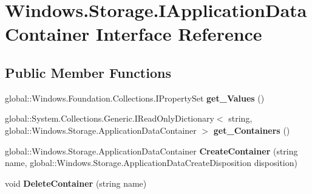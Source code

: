\hypertarget{interface_windows_1_1_storage_1_1_i_application_data_container}{}\section{Windows.\+Storage.\+I\+Application\+Data\+Container Interface Reference}
\label{interface_windows_1_1_storage_1_1_i_application_data_container}
\subsection*{Public Member Functions}
\begin{DoxyCompactItemize}
\item 
\mbox{\label{interface_windows_1_1_storage_1_1_i_application_data_container_a6a8a475818330878971aadb509a49dde}} 
global\+::\+Windows.\+Foundation.\+Collections.\+I\+Property\+Set {\bfseries get\+\_\+\+Values} ()
\item 
\mbox{\label{interface_windows_1_1_storage_1_1_i_application_data_container_a08ebbc78fa92d7dcaea9b36261b01f7c}} 
global\+::\+System.\+Collections.\+Generic.\+I\+Read\+Only\+Dictionary$<$ string, global\+::\+Windows.\+Storage.\+Application\+Data\+Container $>$ {\bfseries get\+\_\+\+Containers} ()
\item 
\mbox{\label{interface_windows_1_1_storage_1_1_i_application_data_container_ad3ca0020aa9ff4735e605413e9948f61}} 
global\+::\+Windows.\+Storage.\+Application\+Data\+Container {\bfseries Create\+Container} (string name, global\+::\+Windows.\+Storage.\+Application\+Data\+Create\+Disposition disposition)
\item 
\mbox{\label{interface_windows_1_1_storage_1_1_i_application_data_container_a900abad7d6853503cdd95e3d82cd2867}} 
void {\bfseries Delete\+Container} (string name)
\item 
\mbox{\label{interface_windows_1_1_storage_1_1_i_application_data_container_a6a8a475818330878971aadb509a49dde}} 

\end{DoxyCompactItemize}
